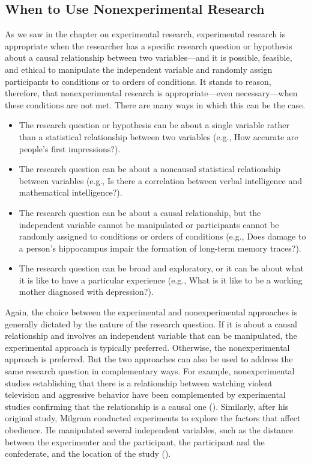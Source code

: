 \documentclass[
]{krantz}
\providecommand{\tightlist}{%
  \setlength{\itemsep}{0pt}\setlength{\parskip}{0pt}}
\begin{document}
\subsection*{When to Use Nonexperimental Research}\label{when-to-use-nonexperimental-research}


As we saw in the chapter on experimental research, experimental research is appropriate when the researcher has a specific research question or hypothesis about a causal relationship between two variables---and it is possible, feasible, and ethical to manipulate the independent variable and randomly assign participants to conditions or to orders of conditions. It stands to reason, therefore, that nonexperimental research is appropriate---even necessary---when these conditions are not met. There are many ways in which this can be the case.

\begin{itemize}
\tightlist
\item
  The research question or hypothesis can be about a single variable rather than a statistical relationship between two variables (e.g., How accurate are people's first impressions?).
\item
  The research question can be about a noncausal statistical relationship between variables (e.g., Is there a correlation between verbal intelligence and mathematical intelligence?).
\item
  The research question can be about a causal relationship, but the independent variable cannot be manipulated or participants cannot be randomly assigned to conditions or orders of conditions (e.g., Does damage to a person's hippocampus impair the formation of long-term memory traces?).
\item
  The research question can be broad and exploratory, or it can be about what it is like to have a particular experience (e.g., What is it like to be a working mother diagnosed with depression?).
\end{itemize}

Again, the choice between the experimental and nonexperimental approaches is generally dictated by the nature of the research question. If it is about a causal relationship and involves an independent variable that can be manipulated, the experimental approach is typically preferred. Otherwise, the nonexperimental approach is preferred. But the two approaches can also be used to address the same research question in complementary ways. For example, nonexperimental studies establishing that there is a relationship between watching violent television and aggressive behavior have been complemented by experimental studies confirming that the relationship is a causal one (). Similarly, after his original study, Milgram conducted experiments to explore the factors that affect obedience. He manipulated several independent variables, such as the distance between the experimenter and the participant, the participant and the confederate, and the location of the study ().
\end{document}
